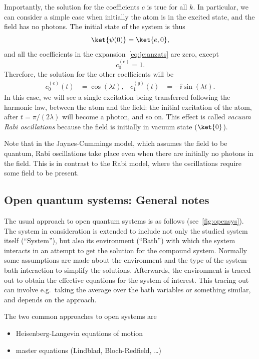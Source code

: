 \documentclass[fontsize=9pt,bookmarkpackage=false]{scrartcl}
\begin{document}
Importantly, the solution for the coefficients $c$ is true for all $k$.
In particular, we can consider a simple case when initially the atom is in the excited state, and the field has no photons.
The initial state of the system is thus
\begin{equation}
  \ket{ \psi (0) } = \ket{ e, 0 },
\end{equation}
and all the coefficients in the expansion~\eqref{eq:jc:anzats} are zero, except
\begin{equation}
  c_0^{(e)} = 1.
\end{equation}
Therefore, the solution for the other coefficients will be
\begin{align}
  c_0^{(e)} (t) & = \cos(  \lambda t ),
  &
  c_1^{(g)} (t) & = - \ii \sin ( \lambda t ).
\end{align}
In this case, we will see a single excitation being transferred following the harmonic law, between the atom and the field: the initial excitation of the atom, after $t = \pi / ( 2 \lambda)$ will become a photon, and so on.
This effect is called \emph{vacuum Rabi oscillations} because the field is initially in vacuum state ($\ket{ 0}$).

Note that in the Jaynes-Cummings model, which assumes the field to be quantum, Rabi oscillations take place even when there are initially no photons in the field.
This is in contrast to the Rabi model, where the oscillations require some field to be present.


\subsection{Open quantum systems: General notes} %
\label{sec:open_quantum_systems}

The usual approach to open quantum systems is as follows (see~\cref{fig:opensys}).
The system in consideration is extended to include not only the studied system itself (``System''), but also its environment (``Bath'') with which the system interacts in an attempt to get the solution for the compound system.
Normally some assumptions are made about the environment and the type of the system-bath interaction to simplify the solutions.
Afterwards, the environment is traced out to obtain the effective equations for the system of interest.
This tracing out can involve e.g.\ taking the average over the bath variables or something similar, and depends on the approach.

The two common approaches to open systems are
\begin{itemize}
  \tightlist
  \item Heisenberg-Langevin equations of motion
  \item master equations (Lindblad, Bloch-Redfield, \dots)
\end{itemize}
\end{document}
